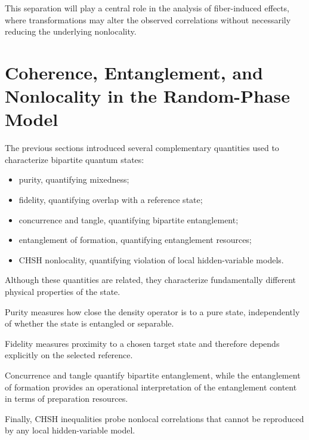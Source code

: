 \medskip

This separation will play a central role in the analysis of fiber-induced effects, where transformations may alter the observed correlations without necessarily reducing the underlying nonlocality.

\medskip


\section{Coherence, Entanglement, and Nonlocality in the Random-Phase Model}

The previous sections introduced several complementary quantities used to characterize bipartite quantum states:

\begin{itemize}
    \item purity, quantifying mixedness;
    \item fidelity, quantifying overlap with a reference state;
    \item concurrence and tangle, quantifying bipartite entanglement;
    \item entanglement of formation, quantifying entanglement resources;
    \item CHSH nonlocality, quantifying violation of local hidden-variable models.
\end{itemize}

\medskip

Although these quantities are related, they characterize fundamentally different physical properties of the state.

\medskip

Purity measures how close the density operator is to a pure state, independently of whether the state is entangled or separable.

Fidelity measures proximity to a chosen target state and therefore depends explicitly on the selected reference.

Concurrence and tangle quantify bipartite entanglement, while the entanglement of formation provides an operational interpretation of the entanglement content in terms of preparation resources.

Finally, CHSH inequalities probe nonlocal correlations that cannot be reproduced by any local hidden-variable model.

